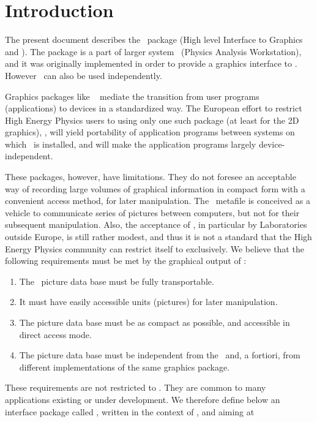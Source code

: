 \chapter{Introduction}
The present document describes the \HIGZ~package
(High level Interface to Graphics and \ZEBRA). The package is a part of
larger system \PAW~(Physics Analysis Workstation)\cite{bib-PAW},
and it was originally implemented in order to provide a
graphics interface to \PAW. However \HIGZ~can also be used independently.
\par 
Graphics packages like \GKS~\cite{bib-GKS1} mediate the transition from user
programs (applications) to devices in a standardized way. The European effort 
to restrict High Energy Physics users to using only one such package (at least
for the 2D graphics), \GKS, will yield portability of application programs
between systems on which \GKS~is installed, and will make the application 
programs largely device-independent.
\par
These packages, however, have limitations. They do not foresee an acceptable way
of recording large volumes of graphical information in compact form with a 
convenient access method, for later manipulation. The \GKS~metafile is
 conceived as a vehicle to communicate series of pictures
between computers, but not for their subsequent manipulation. Also, the 
acceptance of \GKS, in particular by Laboratories outside Europe, is still
rather modest, and thus it is not a standard that the High Energy Physics
community can restrict itself to exclusively. We believe that the following
requirements must be met by the graphical output of \PAW:
\begin{enumerate}
\item The \PAW~picture data base must be fully transportable.
\item It must have easily accessible units (pictures) for later manipulation.
\item The picture data base must be as compact as possible, and accessible in
      direct access mode.
\item The picture data base must be independent from the \UGP~and, a fortiori,
      from different implementations of the same graphics package.
\end{enumerate}
\par 
These requirements are not restricted to \PAW. They are common to many 
applications existing or under development. We therefore define below an 
interface package called \HIGZ, written in the context of \PAW, and aiming at
